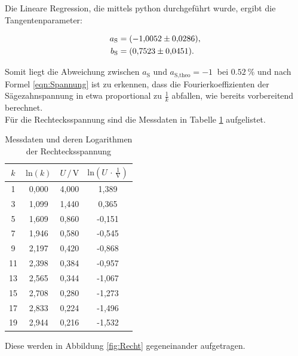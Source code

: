 Die Lineare Regression, die mittels python durchgeführt wurde, ergibt die Tangentenparameter:

\begin{align*}
    a_\text{S} &= \SI{-1.0052 \pm 0.0286}{}, \\
    b_\text{S} &= \SI{0.7523 \pm 0.0451}{}.
\end{align*}

Somit liegt die Abweichung zwischen $a_\text{S}$ und $a_\text{S,theo} = \SI{-1}{}$ bei $\SI{0.52}{\percent}$ und
nach Formel \eqref{eqn:Spannung} ist zu erkennen, dass die Fourierkoeffizienten der Sägezahnspannung in etwa
proportional zu $\frac{1}{k}$ abfallen, wie bereits vorbereitend berechnet.
\\
Für die Rechtecksspannung sind die Messdaten in Tabelle \ref{tab:Messdaten2} aufgelistet.

\begin{table}[H]
    \centering
    \caption{Messdaten und deren Logarithmen der Rechtecksspannung}
    \label{tab:Messdaten2}
    \begin{tabular}{c c c c}
    \toprule
    $k$ & $\text{ln} (k)$ & $U \,/\, \si{\volt}$ & $\text{ln}(U \, \cdot \, \frac{1}{\si{\volt}})$ \\
    \midrule
    1 & 0,000 & 4,000 &  1,389 \\
    3 & 1,099 & 1,440 &  0,365 \\
    5 & 1,609 & 0,860 & -0,151 \\
    7 & 1,946 & 0,580 & -0,545 \\
    9 & 2,197 & 0,420 & -0,868 \\
   11 & 2,398 & 0,384 & -0,957 \\
   13 & 2,565 & 0,344 & -1,067 \\
   15 & 2,708 & 0,280 & -1,273 \\
   17 & 2,833 & 0,224 & -1,496 \\
   19 & 2,944 & 0,216 & -1,532 \\
    \bottomrule
    \end{tabular}
\end{table} 

Diese werden in Abbildung \ref{fig:Recht} gegeneinander aufgetragen. 

